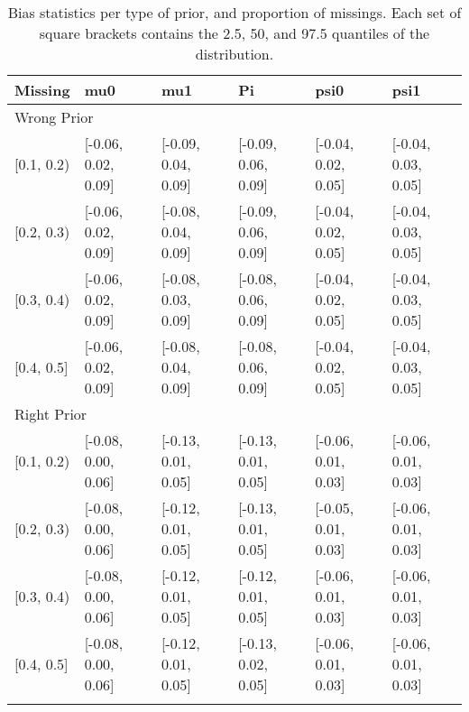 \begin{table}[ht]
\centering
\begin{tabular}{llllll}
  \toprule
Missing & mu0 & mu1 & Pi & psi0 & psi1 \\ 
  \midrule
\multicolumn{6}{l}{Wrong Prior}\\
{[0.1, 0.2)} & {[-0.06, 0.02, 0.09]} & {[-0.09, 0.04, 0.09]} & {[-0.09, 0.06, 0.09]} & {[-0.04, 0.02, 0.05]} & {[-0.04, 0.03, 0.05]} \\ 
  {[0.2, 0.3)} & {[-0.06, 0.02, 0.09]} & {[-0.08, 0.04, 0.09]} & {[-0.09, 0.06, 0.09]} & {[-0.04, 0.02, 0.05]} & {[-0.04, 0.03, 0.05]} \\ 
  {[0.3, 0.4)} & {[-0.06, 0.02, 0.09]} & {[-0.08, 0.03, 0.09]} & {[-0.08, 0.06, 0.09]} & {[-0.04, 0.02, 0.05]} & {[-0.04, 0.03, 0.05]} \\ 
  {[0.4, 0.5]} & {[-0.06, 0.02, 0.09]} & {[-0.08, 0.04, 0.09]} & {[-0.08, 0.06, 0.09]} & {[-0.04, 0.02, 0.05]} & {[-0.04, 0.03, 0.05]} \\ 
   \midrule
\multicolumn{6}{l}{Right Prior}\\
{[0.1, 0.2)} & {[-0.08, 0.00, 0.06]} & {[-0.13, 0.01, 0.05]} & {[-0.13, 0.01, 0.05]} & {[-0.06, 0.01, 0.03]} & {[-0.06, 0.01, 0.03]} \\ 
  {[0.2, 0.3)} & {[-0.08, 0.00, 0.06]} & {[-0.12, 0.01, 0.05]} & {[-0.13, 0.01, 0.05]} & {[-0.05, 0.01, 0.03]} & {[-0.06, 0.01, 0.03]} \\ 
  {[0.3, 0.4)} & {[-0.08, 0.00, 0.06]} & {[-0.12, 0.01, 0.05]} & {[-0.12, 0.01, 0.05]} & {[-0.06, 0.01, 0.03]} & {[-0.06, 0.01, 0.03]} \\ 
  {[0.4, 0.5]} & {[-0.08, 0.00, 0.06]} & {[-0.12, 0.01, 0.05]} & {[-0.13, 0.02, 0.05]} & {[-0.06, 0.01, 0.03]} & {[-0.06, 0.01, 0.03]} \\ 
   \bottomrule
\multicolumn{6}{l}{}\\
\end{tabular}
\caption{Bias statistics per type of prior, and proportion of missings. Each set of square brackets contains the 2.5, 50, and 97.5 quantiles of the distribution.} 
\label{tab:bias-prior-missigness}
\end{table}
